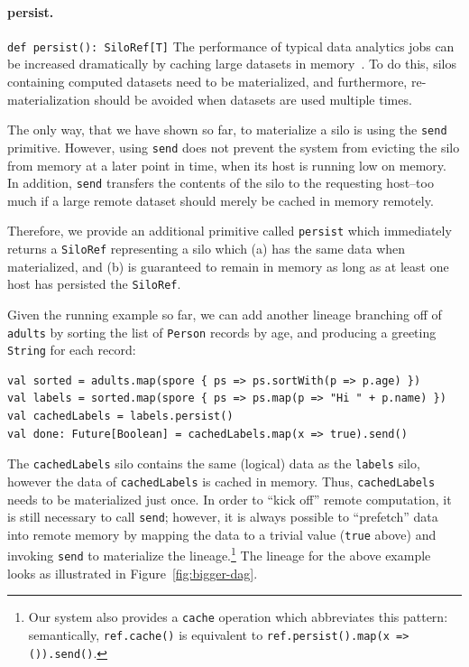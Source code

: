 \documentclass{jfp1}
\begin{document}
\paragraph{persist.}%
%
\texttt{def persist(): SiloRef[T]} \newline
%
The performance of typical data analytics jobs can be increased
dramatically by caching large datasets in memory~\cite{Spark}. To do
this, silos containing computed datasets need to be materialized, and
furthermore, re-materialization should be avoided when datasets are
used multiple times.

The only way, that we have shown so far, to materialize a silo is
using the \verb|send| primitive. However, using \verb|send| does not
prevent the system from evicting the silo from memory at a later point
in time, \eg when its host is running low on memory. In addition,
\verb|send| transfers the contents of the silo to the requesting
host--too much if a large remote dataset should merely be cached in
memory remotely.

Therefore, we provide an additional primitive called \verb|persist|
which immediately returns a \verb|SiloRef| representing a silo which
(a) has the same data when materialized, and (b) is guaranteed to
remain in memory as long as at least one host has persisted the \verb|SiloRef|.

Given the running example so far, we can add another lineage branching
off of \verb|adults| by sorting the list of \verb|Person| records by
age, and producing a greeting \verb|String| for each record:

\begin{lstlisting}
val sorted = adults.map(spore { ps => ps.sortWith(p => p.age) })
val labels = sorted.map(spore { ps => ps.map(p => "Hi " + p.name) })
val cachedLabels = labels.persist()
val done: Future[Boolean] = cachedLabels.map(x => true).send()
\end{lstlisting}
\noindent
The \verb|cachedLabels| silo contains the same (logical) data as the
\verb|labels| silo, however the data of \verb|cachedLabels| is cached
in memory. Thus, \verb|cachedLabels| needs to be materialized just
once. In order to ``kick off'' remote computation, it is still
necessary to call \verb|send|; however, it is always possible to
``prefetch'' data into remote memory by mapping the data to a trivial
value (\verb|true| above) and invoking \verb|send| to materialize the
lineage.\footnote{Our system also provides a \texttt{cache} operation
  which abbreviates this pattern: semantically, \texttt{ref.cache()}
  is equivalent to \texttt{ref.persist().map(x => ()).send()}.} The
lineage for the above example looks as illustrated in
Figure~\ref{fig:bigger-dag}.
\end{document}
